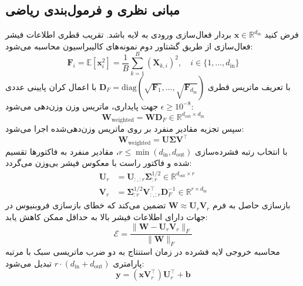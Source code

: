 \subsection{مبانی نظری و فرمول‌بندی ریاضی}
فرض کنید $\mathbf{x} \in \mathbb{R}^{d_{\text{in}}}$ بردار فعال‌سازی ورودی به لایه باشد. تقریب قطری اطلاعات فیشر فعال‌سازی از طریق گشتاور دوم نمونه‌های کالیبراسیون محاسبه می‌شود:
\begin{equation}
\mathbf{F}_i = \mathbb{E}\left[\mathbf{x}_i^2\right] = \frac{1}{B} \sum_{k=1}^B (\mathbf{X}_{k, i})^2, \quad i \in \{1, \dots, d_{\text{in}}\}
\end{equation}
با تعریف ماتریس قطری $\mathbf{D}_F = \text{diag}\left(\sqrt{\mathbf{F}_1}, \dots, \sqrt{\mathbf{F}_{d_{\text{in}}}}\right)$ با اعمال کران پایینی عددی $\epsilon \ge 10^{-8}$ جهت پایداری، ماتریس وزن وزن‌دهی می‌شود:
\begin{equation}
\mathbf{W}_{\text{weighted}} = \mathbf{W} \mathbf{D}_F \in \mathbb{R}^{d_{\text{out}} \times d_{\text{in}}}
\end{equation}
سپس تجزیه مقادیر منفرد بر روی ماتریس وزن‌دهی‌شده اجرا می‌شود:
\begin{equation}
\mathbf{W}_{\text{weighted}} = \mathbf{U} \mathbf{\Sigma} \mathbf{V}^\top
\end{equation}
با انتخاب رتبه فشرده‌سازی $r \le \min(d_{\text{in}}, d_{\text{out}})$، مقادیر منفرد به فاکتورها تقسیم شده و فاکتور راست با معکوس فیشر بی‌وزن می‌گردد:
\begin{align}
\mathbf{U}_r &= \mathbf{U}_{:, :r} \mathbf{\Sigma}_{:r}^{1/2} \in \mathbb{R}^{d_{\text{out}} \times r} \\
\mathbf{V}_r &= \mathbf{\Sigma}_{:r}^{1/2} \mathbf{V}_{:, :r}^\top \mathbf{D}_F^{-1} \in \mathbb{R}^{r \times d_{\text{in}}}
\end{align}
بازسازی حاصل به فرم $\mathbf{W} \approx \mathbf{U}_r \mathbf{V}_r$ تضمین می‌کند که خطای بازسازی فروبنیوس در جهات دارای اطلاعات فیشر بالا به حداقل ممکن کاهش یابد:
\begin{equation}
\mathcal{E} = \frac{\|\mathbf{W} - \mathbf{U}_r \mathbf{V}_r\|_F}{\|\mathbf{W}\|_F}
\end{equation}
محاسبه خروجی لایه فشرده در زمان استنتاج به دو ضرب ماتریسی سبک با مرتبه پارامتری $r \cdot (d_{\text{in}} + d_{\text{out}})$ تبدیل می‌شود:
\begin{equation}
\mathbf{y} = (\mathbf{x} \mathbf{V}_r^\top) \mathbf{U}_r^\top + \mathbf{b}
\end{equation}

